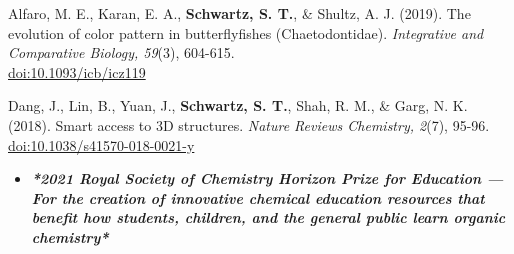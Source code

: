 \pubspace

Alfaro, M. E., Karan, E. A., \textbf{Schwartz, S. T.}, \& Shultz, A. J. (2019). The evolution of color pattern in butterflyfishes (Chaetodontidae). \textit{Integrative and Comparative Biology, 59}(3), 604-615.\\ \textcolor{RoyalBlue}{\href{https://doi.org/10.1093/icb/icz119}{doi:10.1093/icb/icz119}}

\pubspace

Dang, J., Lin, B., Yuan, J., \textbf{Schwartz, S. T.}, Shah, R. M., \& Garg, N. K. (2018). Smart access to 3D structures. \textit{Nature Reviews Chemistry, 2}(7), 95-96. \textcolor{RoyalBlue}{\href{https://doi.org/10.1038/s41570-018-0021-y}{doi:10.1038/s41570-018-0021-y}}
\begin{itemize}[label={}, leftmargin=0.5cm, topsep=0.2cm]
    \item \textbf{\textit{*2021 Royal Society of Chemistry Horizon Prize for Education --- For the creation of innovative chemical education resources that benefit how students, children, and the general public learn organic chemistry*}}
\end{itemize}







